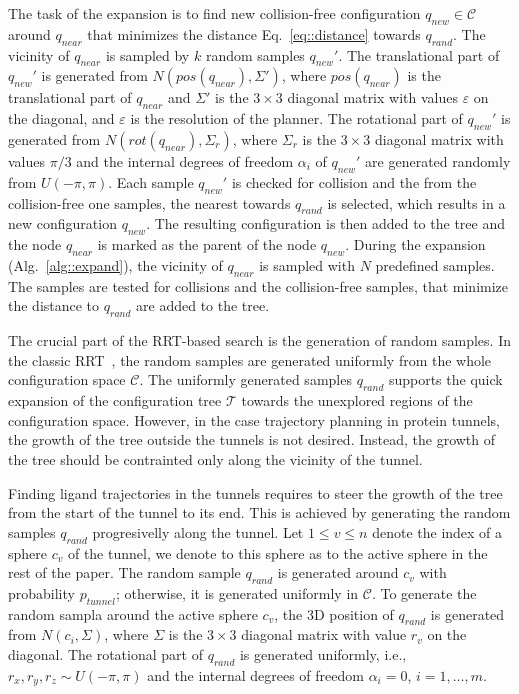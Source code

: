 \documentclass{bmcart}
\def\qrand{q_{rand}}
\def\qnear{q_{near}}
\def\qnew{q_{new}}
\def\T{\mathcal{T}}
\def\C{\mathcal{C}}
\def\gb{p_{tunnel}}
\begin{document}
The task of the expansion is to find new collision-free configuration $\qnew \in \C$ around $\qnear$ that minimizes the distance
Eq.~\eqref{eq::distance} towards $\qrand$.
The vicinity of $\qnear$ is sampled by $k$ random samples $\qnew'$. 
The translational part of $\qnew'$ is generated from $N(pos(\qnear),\Sigma')$, 
where $pos(\qnear)$ is the translational part of $\qnear$ and $\Sigma'$ is
the $3 \times 3$ diagonal matrix with values $\varepsilon$ on the diagonal, and $\varepsilon$ is the resolution of the planner.
The rotational part of $\qnew'$ is generated from $N(rot(\qnear), \Sigma_r)$, where $\Sigma_r$ is the $3 \times 3$ diagonal
matrix with values $\pi/3$ and the internal degrees of freedom $\alpha_i$ of $\qnew'$ are generated
randomly from $U(-\pi,\pi)$.
Each sample $\qnew'$ is checked for collision and the from the collision-free one samples, the nearest towards $\qrand$ is 
selected, which results in a new configuration $\qnew$.
The resulting configuration is then added to the tree and the node $\qnear$ is marked as the parent of the node $\qnew$.
During the expansion (Alg.~\ref{alg::expand}), the vicinity of $\qnear$ is sampled with $N$ predefined samples.
The samples are tested for collisions and the collision-free samples, that minimize the distance to $\qrand$ are added to the tree.

The crucial part of the RRT-based search is the generation of random samples.
In the classic RRT~\cite{lavalleRRT}, the random samples are generated uniformly from the whole configuration space $\C$.
The uniformly generated samples $\qrand$ supports the quick expansion of the configuration tree $\T$ towards the unexplored
regions of the configuration space.
However, in the case trajectory planning in protein tunnels, the growth of the tree outside the tunnels is not desired.
Instead, the growth of the tree should be contrainted only along the vicinity of the tunnel.

Finding ligand trajectories in the tunnels requires to steer the growth of the tree from the start of the tunnel to its end.
This is achieved by generating the random samples $\qrand$ progresivelly along the tunnel.
Let $1 \le v \le n$ denote the index of a sphere $c_v$ of the tunnel, we denote to this sphere as to the active sphere in the rest of the paper.
The random sample $\qrand$ is generated around  $c_v$ with probability $\gb$; otherwise, it is generated uniformly in $\C$.
To generate the random sampla around the active sphere $c_v$, the 3D position of $\qrand$ is generated from $N(c_i,\Sigma)$, where
$\Sigma$ is the $3\times 3$ diagonal matrix with value $r_v$ on the diagonal.
The rotational part of $\qrand$ is generated uniformly, i.e., $r_x,r_y,r_z \sim U(-\pi,\pi)$ and the internal degrees of 
freedom $\alpha_i=0$, $i=1,\ldots,m$.
\end{document}
